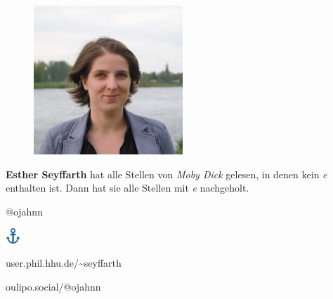 \documentclass[a5paper,9pt,twoside=false]{extbook}
\begin{document}
\bigskip

\begin{figure}[h]
{ \centering
\includegraphics[width=0.5\textwidth]{esther.jpg} \\
}
\end{figure}

\noindent\textbf{Esther Seyffarth} hat alle Stellen von \textit{Moby Dick} gelesen, in denen kein \textit{e} enthalten ist. Dann hat sie alle Stellen mit \textit{e} nachgeholt.

\bigskip

\noindent\begin{minipage}{0.05\textwidth}
\vspace*{-5pt}
\end{minipage}
\begin{minipage}{0.12\textwidth}
{@}ojahnn
\end{minipage}
\hspace{5pt}
\noindent\begin{minipage}{0.05\textwidth}
\vspace*{-5pt}
\includegraphics[width=16pt]{anchor.png}
\end{minipage}
\begin{minipage}{0.39\textwidth}
user.phil.hhu.de/\textasciitilde seyffarth
\end{minipage}
\noindent\begin{minipage}{0.05\textwidth}
\vspace*{-5pt}
\end{minipage}
\begin{minipage}{0.3\textwidth}
oulipo.social/{@}ojahnn
\end{minipage}
\end{document}
